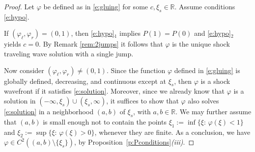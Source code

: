 \documentclass[11pt,a4paper]{article}
\renewcommand{\phi}{\varphi}
\begin{document}
\begin{proof}
Let $\phi$ be defined as in \eqref{e:gluing} for some $c, \xi_s \in \mathbb{R}$. Assume  conditions  \eqref{e:hypo}. 

If  $(\varphi_\ell,\varphi_r)=(0,1)$, then \eqref{e:hypo}$_1$ implies $P(1)=P(0)$ and \eqref{e:hypo}$_2$ yields $c=0$. By Remark \ref{rem:2jumps} it follows that $\phi$ is the unique shock traveling wave solution with a single jump. 

Now consider $(\varphi_\ell, \varphi_r)\neq (0,1)$. Since the function $\varphi$ defined in \eqref{e:gluing} is globally defined, decreasing, and continuous except at $\xi_s$, then $\phi$ is a shock wavefront if it satisfies \eqref{e:solution}. Moreover, since we already know that $\phi$ is a solution in $(-\infty,\xi_s)\cup(\xi_s,\infty)$, it suffices to show that $\phi$ also solves \eqref{e:solution} in a neighborhood $(a,b)$ of $\xi_s$, with $a,b\in \mathbb{R}$. We may further assume that $(a,b)$ is small enough not to contain the points 
$\xi_1 := \inf\{\xi:\, \varphi(\xi)<1\}$ and $\xi_2 := \sup\{ \xi:\, \varphi(\xi)>0\}$,
whenever they are finite. As a conclusion, we have $\varphi \in C^2\left((a,b)\setminus\{\xi_s\}\right)$, by Proposition~\ref{p:Pconditions}{\em (iii)}. %


\end{proof}
\end{document}
